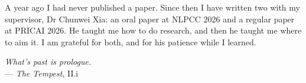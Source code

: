 A year ago I had never published a paper. Since then I have written two with my
supervisor, Dr Chunwei Xia: an oral paper at NLPCC 2026 and a regular paper at
PRICAI 2026. He taught me how to do research, and then he taught me where to
aim it. I am grateful for both, and for his patience while I learned.

\bigskip
\begin{flushright}
\emph{What's past is prologue.}\\[1mm]
{\footnotesize --- \emph{The Tempest}, II.i}
\end{flushright}

